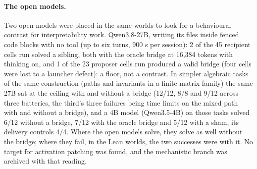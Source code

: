 \documentclass[11pt]{article}
\begin{document}
\paragraph{The open models.} Two open models were placed in the same
worlds to look for a behavioural contrast for interpretability work.
Qwen3.8-27B, writing its files inside fenced code blocks with no tool (up
to six turns, 900 s per session): 2 of the 45 recipient cells run solved a
sibling, both with the oracle bridge at 16{,}384 tokens with thinking on,
and 1 of the 23 proposer cells run produced a valid bridge (four cells were
lost to a launcher defect): a floor, not a contrast. In simpler
algebraic tasks of the same construction (paths and invariants in a finite
matrix family) the same 27B sat at the ceiling with and without a bridge
(12/12, 8/8 and 9/12 across three batteries, the third's three failures
being time limits on the mixed path with and without a bridge), and a 4B
model (Qwen3.5-4B) on those tasks solved 6/12 without a bridge, 7/12 with
the oracle bridge and 5/12 with a sham, its delivery controls 4/4. Where
the open models solve, they solve as well without the bridge; where they
fail, in the Lean worlds, the two successes were with it. No target for
activation patching was found, and the mechanistic branch was archived
with that reading.
\end{document}
